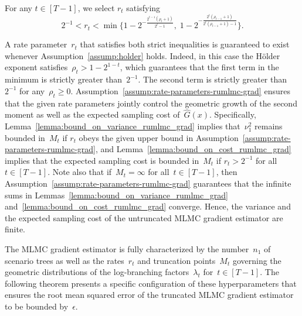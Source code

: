 \documentclass[11pt]{article}
\let\hat\widehat
\begin{document}
\begin{assumption} 
\label{assump:rate-parameters-rumlmc-grad}
For any $t\in[T-1]$, we select $r_t$ satisfying
    \[
       2^{-1} < r_t < \min\bigg\{1-2^{-\frac{2^{t-1}(\rho_t+1)}{2^t-1}},\; 1-2^{-\frac{2^t(\rho_{t-1}+1)}{2^t(\rho_{t-1}+1)-1}}\bigg\}.
    \]
\end{assumption}
A rate parameter~$r_t$ that satisfies both strict inequalities is guaranteed to exist whenever Assumption~\ref{assump:holder} holds. Indeed, in this case the H\"older exponent satisfies~$\rho_t > 1-2^{1-t}$, which guarantees that the first term in the minimum is strictly greater than~$2^{-1}$. The second term is strictly greater than~$2^{-1}$ for any~$\rho_t\geq 0$. Assumption~\ref{assump:rate-parameters-rumlmc-grad} ensures that the given rate parameters jointly control the geometric growth of the second moment as well as the expected sampling cost of~$\hat{G}(x)$. Specifically, Lemma~\ref{lemma:bound_on_variance_rumlmc_grad} implies that~$\nu_1^2$ remains bounded in~$M_t$ if $r_t$ obeys the given upper bound in Assumption~\ref{assump:rate-parameters-rumlmc-grad}, and Lemma~\ref{lemma:bound_on_cost_rumlmc_grad} implies that the expected sampling cost is bounded in~$M_t$ if $r_t > 2^{-1}$ for all~$t \in [T-1]$.  Note also that if~$M_t=\infty$ for all~$t\in[T-1]$, then Assumption~\ref{assump:rate-parameters-rumlmc-grad} guarantees that the infinite sums in Lemmas~\ref{lemma:bound_on_variance_rumlmc_grad} and~\ref{lemma:bound_on_cost_rumlmc_grad} converge. Hence, the variance and the expected sampling cost of the untruncated MLMC gradient estimator are finite. 

The MLMC gradient estimator is fully characterized by the number~$n_1$ of scenario trees as well as the rates~$r_t$ and truncation points~$M_t$ governing the geometric distributions of the log-branching factors~$\lambda_t$ for~$t \in [T-1]$. The following theorem presents a specific configuration of these hyperparameters that ensures the root mean squared error of the truncated MLMC gradient estimator to be bounded by~$\epsilon$. 
\end{document}
